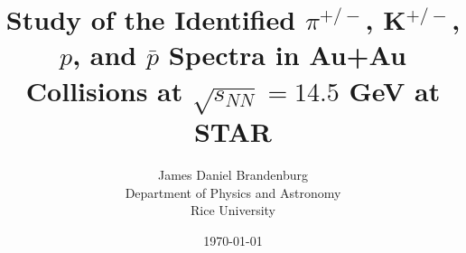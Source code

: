 \documentclass[12pt]{article}
\title{ Study of the Identified $\pi^{+/-}$, K$^{+/-}$, $p$, and $\bar{p}$ Spectra in Au+Au Collisions at $\sqrt{s_{NN}}=14.5$ GeV at STAR }
\author{
        James Daniel Brandenburg \\
        Department of Physics and Astronomy\\
        Rice University
}
\date{\today}
\begin{document}
	\maketitle


	\clearpage
	\tableofcontents
	\clearpage

	
	
	
	
	\singlespacing
	\footnotesize
	
	
\end{document}
